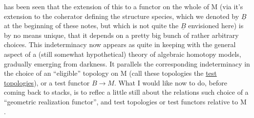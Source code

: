 has been seen that the extension of this to a functor on the whole of
M (via it's extension to the  coherator defining the structure species,
which we denoted by $\underline{B}$ at the beginning of these notes, but which is
not quite the $\underline{B}$ envisioned here) is by no means unique, that it depends
on a pretty big bunch of rather arbitrary choices. This indeterminacy
now appears as quite in keeping with the general aspect of a (still
somewhat hypothetical) theory of algebraic homotopy models, gradually
emerging from darkness. It parallels the corresponding indeterminacy
in the choice of an ``eligible'' topology on M (call these topologies
the \uline{test topologies}), or   a test functor $B \to M$. What I would
like now to do, before coming back to stacks, is to reflec a little
still about the relations   such choice of a ``geometric realization
functor'', and test topologies or test functors relative to M .
